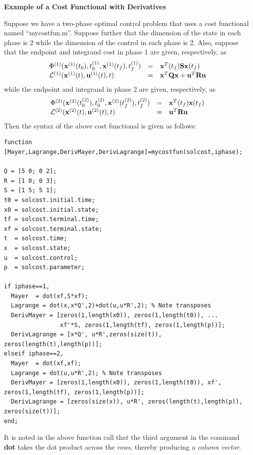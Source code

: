 \documentclass[10pt]{article}
\newenvironment{shadedframe}{%
  \def\FrameCommand{\fcolorbox{black}{shadecolor}}%
  \MakeFramed {\FrameRestore}}
{\endMakeFramed}
\begin{document}
\scriptsize
\begin{shadedframe}
{\noindent}{\bf Example of a Cost Functional with Derivatives}
\vspace{12pt}

Suppose we have a two-phase optimal control problem that uses a cost
functional named ``mycostfun.m''.  Suppose further that the dimension of the
state in each phase is 2 while the dimension of the control in each phase is
2.  Also, suppose that the endpoint and integrand cost in phase 1 are
given, respectively, as
\begin{displaymath}
  \begin{array}{lcl}
    \Phi^{(1)}(\mathbf{x}^{(1)}(t_0),t_0^{(1)},\mathbf{x}^{(1)}(t_f),t_f^{(1)}) & = & \mathbf{x}^T(t_f)\mathbf{S}\mathbf{x}(t_f) \\
    \mathcal{L}^{(1)}(\mathbf{x}^{(1)}(t),\mathbf{u}^{(1)}(t),t) & = & \mathbf{x}^T\mathbf{Q}\mathbf{x} + \mathbf{u}^T\mathbf{R}\mathbf{u}
  \end{array}
\end{displaymath}
while the endpoint and integrand in phase 2 are given, respectively, as
\begin{displaymath}
  \begin{array}{lcl}
    \Phi^{(2)}(\mathbf{x}^{(2)}(t_0^{(2)}),t_0^{(2)},\mathbf{x}^{(2)}(t_f^{(2)}),t_f^{(2)}) & = & \mathbf{x}^T(t_f)\mathbf{x}(t_f) \\
    \mathcal{L}^{(2)}(\mathbf{x}^{(2)}(t),\mathbf{u}^{(2)}(t),t) & = & \mathbf{u}^T\mathbf{R}\mathbf{u}
  \end{array}
\end{displaymath}
Then the syntax of the above cost functional is given as follows:
\begin{verbatim}
function [Mayer,Lagrange,DerivMayer,DerivLagrange]=mycostfun(solcost,iphase);

Q = [5 0; 0 2];
R = [1 0; 0 3];
S = [1 5; 5 1];
t0 = solcost.initial.time;
x0 = solcost.initial.state;
tf = solcost.terminal.time;
xf = solcost.terminal.state;
t  = solcost.time;
x  = solcost.state;
u  = solcost.control;
p  = solcost.parameter;

if iphase==1,
  Mayer  = dot(xf,S*xf);
  Lagrange = dot(x,x*Q',2)+dot(u,u*R',2); % Note transposes
  DerivMayer = [zeros(1,length(x0)), zeros(1,length(t0)), ...
                xf'*S, zeros(1,length(tf), zeros(1,length(p))];
  DerivLagrange = [x*Q', u*R',zeros(size(t)), zeros(length(t),length(p))];
elseif iphase==2,
  Mayer  = dot(xf,xf);
  Lagrange = dot(u,u*R',2); % Note transposes
  DerivMayer = [zeros(1,length(x0)), zeros(1,length(t0)), xf', zeros(1,length(tf), zeros(1,length(p))];
  DerivLagrange = [zeros(size(x)), u*R', zeros(length(t),length(p)), zeros(size(t))];
end;
\end{verbatim}
It is noted in the above function call that the third argument in the
command {\bf dot} takes the dot product across the {\em rows}, thereby
producing a {\em column vector}.
\end{shadedframe}
\normalsize
\end{document}
